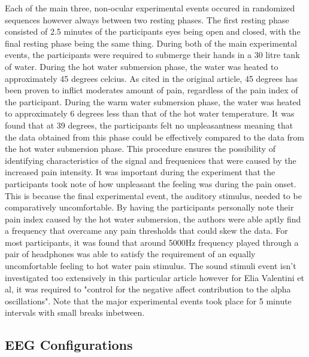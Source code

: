\documentclass[11pt]{article}
\begin{document}
Each of the main three, non-ocular experimental events occured in randomized sequences however always between two resting phases. The first resting phase consisted of 2.5 minutes of the participants eyes being open and closed, with the final resting phase being the same thing. During both of the main experimental events, the participants were required to submerge their hands in a 30 litre tank of water. During the hot water submersion phase, the water was heated to approximately 45 degrees celcius. As cited in the original article, 45 degrees has been proven to inflict moderates amount of pain, regardless of the pain index of the participant. During the warm water submersion phase, the water was heated to approximately 6 degrees less than that of the hot water temperature. It was found that at 39 degrees, the participants felt no unpleasantness meaning that the data obtained from this phase could be effectively compared to the data from the hot water submersion phase. This procedure ensures the possibility of identifying characteristics of the signal and frequenices that were caused by the increased pain intensity. It was important during the experiment that the participants took note of how unpleasant the feeling was during the pain onset. This is because the final experimental event, the auditory stimulus, needed to be comparatively uncomfortable. By having the participants personally note their pain index caused by the hot water submersion, the authors were able aptly find a frequency that overcame any pain thresholds that could skew the data. For most participants, it was found that around 5000Hz frequency played through a pair of headphones was able to satisfy the requirement of an equally uncomfortable feeling to hot water pain stimulus. The sound stimuli event isn't investigated too extensively in this particular article however for Elia Valentini et al, it was required to "control for the negative affect contribution to the alpha oscillations". Note that the major experimental events took place for 5 minute intervals with small breaks inbetween.

\subsection{EEG Configurations}
\end{document}
